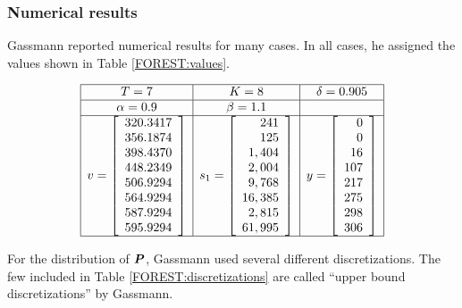 \subsubsection{Numerical results}

Gassmann \cite{gassmann89} reported numerical results for many cases.  In all cases, he assigned the values shown in Table \ref{FOREST:values}.
\begin{table}[ht]
\caption[Values of parameters used in test problems for forest management]{Values of parameters used in Gassmann \cite{gassmann89}}
\label{FOREST:values}
\[
\begin{array}{|c|c|c|}
	\hline
	T = 7 & K = 8 & \delta = 0.905\\
	\hline
	\alpha = 0.9 & \beta = 1.1 &\\
	\hline
	v = \left[ \begin{array}{r}
		320.3417\\
		356.1874\\
		398.4370\\
		448.2349\\
		506.9294\\
		564.9294\\
		587.9294\\
		595.9294 \end{array}\right] 
		&
	s_1 = \left[ \begin{array}{r}
		241\\
		125\\
		1,404\\
		2,004\\
		9,768\\
		16,385\\
		2,815\\
		61,995\end{array}\right]
	&
	y = \left[ \begin{array}{r}
		0\\
		0\\
		16\\
		107\\
		217\\
		275\\
		298\\
		306\end{array}\right]\\  
	\hline
\end{array}
\]
\end{table}
For the distribution of $\mathbf{\boldsymbol{P}}$, Gassmann \cite{gassmann89} used several different discretizations.  The few included in Table \ref{FOREST:discretizations} are called ``upper bound discretizations'' by Gassmann.
